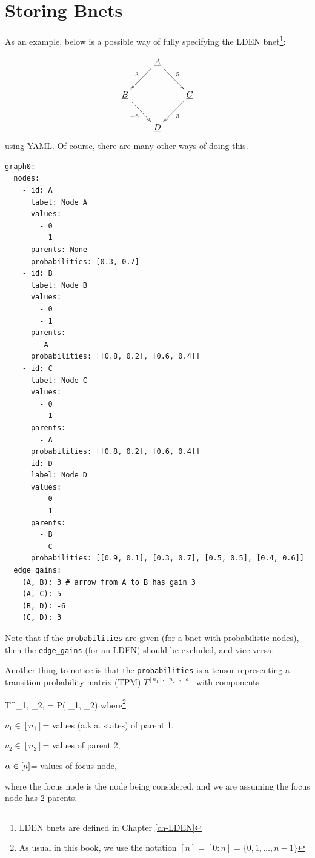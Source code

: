 \section{Storing Bnets}

As an example, below is a
possible way of
fully specifying the LDEN
 bnet\footnote{LDEN bnets are defined in Chapter \ref{ch-LDEN}}:

$$
\xymatrix{
&\ul{A}\ar[dl]_3\ar[dr]^5
\\
\ul{B}\ar[dr]_{-6} & &\ul{C}\ar[dl]^{3} \\
&\ul{D}
}
$$
using YAML. Of course,
there are
many other ways of
doing this.

\begin{mybluearea}
\begin{verbatim}
graph0:
  nodes:
    - id: A
      label: Node A
      values: 
        - 0 
        - 1
      parents: None
      probabilities: [0.3, 0.7]
    - id: B
      label: Node B
      values: 
        - 0 
        - 1
      parents:
        -A
      probabilities: [[0.8, 0.2], [0.6, 0.4]]
    - id: C
      label: Node C
      values:
        - 0
        - 1
      parents: 
        - A   
      probabilities: [[0.8, 0.2], [0.6, 0.4]]
    - id: D
      label: Node D
      values:
        - 0
        - 1
      parents: 
        - B
        - C
      probabilities: [[0.9, 0.1], [0.3, 0.7], [0.5, 0.5], [0.4, 0.6]]
  edge_gains:
    (A, B): 3 # arrow from A to B has gain 3
    (A, C): 5
    (B, D): -6
    (C, D): 3
\end{verbatim}
\end{mybluearea}

Note that if the 
{\tt probabilities}
are given (for a bnet with 
probabilistic nodes), then
the {\tt edge\_gains} (for an LDEN) should be
excluded, and vice versa.


Another thing to notice
is that the {\tt probabilities} is a tensor
representing a transition probability matrix (TPM)
$T^{[n_1], [n_2], [a]}$
with components

\beq
 T^{\nu_1, \nu_2, \alp}= P(\alp|\nu_1, \nu_2)
 \eeq
where\footnote{As usual in this book, we use the notation $[n]=[0:n]=\{0, 1, \ldots, n-1\}$}

$\nu_1\in[n_1]$= values (a.k.a. states) of parent 1,

$\nu_2\in[n_2]$= values of parent 2, 

$\alpha\in[a]$= values of focus node,

where the focus node is the node
being considered, and we are assuming the focus node has 2 parents.
